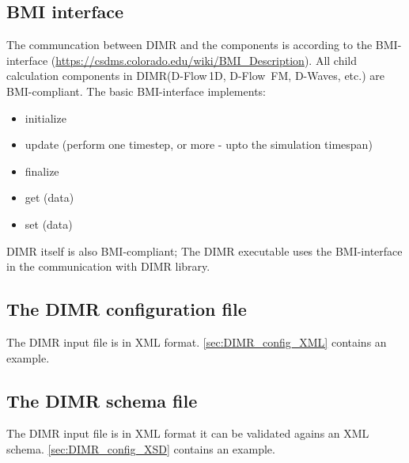 \documentclass[signature]{deltares_manual}
\newcommand{\dwaves}{D-Waves\xspace}
\newcommand{\dflowfm}{\textrm{D-Flow~FM}\xspace}
\newcommand{\dflowoned}{D-Flow\,1D\xspace}
\newcommand{\dimr}{\textrm{DIMR}\xspace}
\begin{document}
\subsection{BMI interface} 
\label{subsec:BMI}
The communcation between \dimr and the components is according to the BMI-interface (\url{https://csdms.colorado.edu/wiki/BMI_Description}). All child calculation components in \dimr (\dflowoned, \dflowfm, \dwaves, etc.) are BMI-compliant. The basic BMI-interface implements:
\begin{itemize}
	\item initialize
	\item update (perform one timestep, or more - upto the simulation timespan)
	\item finalize
	\item get (data)
	\item set (data)
\end{itemize}

\Note \dimr itself is also BMI-compliant; The \dimr executable uses the BMI-interface in the communication with \dimr library.

\subsection{The \dimr configuration file} \label{subsec:DIMRConfig}
The \dimr input file is in XML format. \autoref{sec:DIMR_config_XML} contains an example.

\subsection{The \dimr schema file} 
\label{subsec:DIMRxsd}
The \dimr input file is in XML format it can be validated agains an XML schema. \autoref{sec:DIMR_config_XSD} contains an example.
\end{document}
